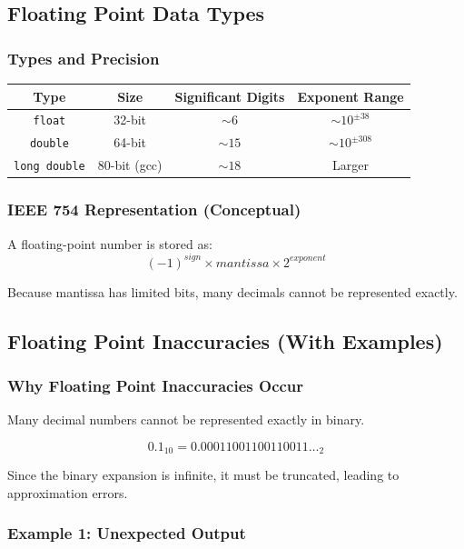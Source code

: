 \documentclass[11pt]{article}
\begin{document}
\subsection{Floating Point Data Types}

\subsubsection{Types and Precision}

\begin{center}
\begin{tabular}{cccc}
\toprule
Type & Size & Significant Digits & Exponent Range \\
\midrule
\texttt{float} & 32-bit & $\sim 6$ & $\sim 10^{\pm38}$ \\
\texttt{double} & 64-bit & $\sim 15$ & $\sim 10^{\pm308}$ \\
\texttt{long double} & 80-bit (gcc) & $\sim 18$ & Larger \\
\bottomrule
\end{tabular}
\end{center}

\subsubsection{IEEE 754 Representation (Conceptual)}
A floating-point number is stored as:
\[
(-1)^{sign} \times mantissa \times 2^{exponent}
\]

Because mantissa has limited bits, many decimals cannot be represented exactly.

\subsection{Floating Point Inaccuracies (With Examples)}

\subsubsection{Why Floating Point Inaccuracies Occur}
Many decimal numbers cannot be represented exactly in binary.

\[
0.1_{10} = 0.00011001100110011\ldots_2
\]

Since the binary expansion is infinite, it must be truncated, leading to approximation errors.

\subsubsection{Example 1: Unexpected Output}
\end{document}
